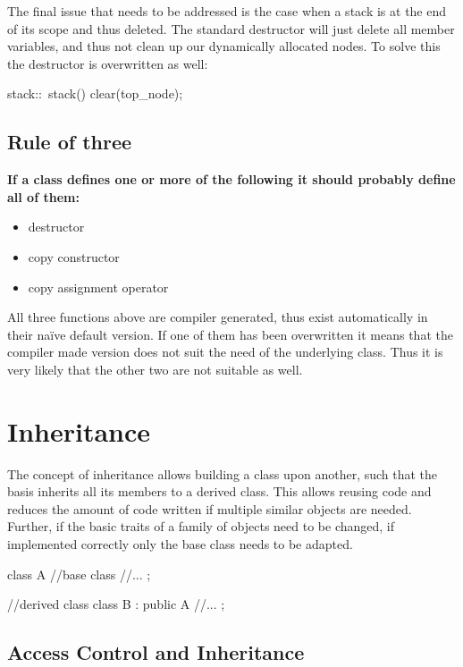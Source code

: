 \documentclass[10pt,a4paper]{scrartcl}
\begin{document}
\begin{multicols*}{2}
The final issue that needs to be addressed is the case when a stack is at the end of its scope and thus deleted. The standard destructor will just delete all member variables, and thus not clean up our dynamically allocated nodes. To solve this the destructor is overwritten as well:

\begin{TPCpp}
stack::~stack() {
	clear(top_node);
}
\end{TPCpp}

\subsection{Rule of three}
\label{sec:RuleOfThree}

\textbf{If a class defines one or more of the following it should probably define all of them:}

\begin{itemize}
\item destructor
\item copy constructor
\item copy assignment operator
\end{itemize}

All three functions above are compiler generated, thus exist automatically in their naïve default version. If one of them has been overwritten it means that the compiler made version does not suit the need of the underlying class. Thus it is very likely that the other two are not suitable as well.

\section{Inheritance}
\label{sec:Inheritance}

The concept of inheritance allows building a class upon another, such that the basis inherits all its members to a derived class. This allows reusing code and reduces the amount of code written if multiple similar objects are needed. Further, if the basic traits of a family of objects need to be changed, if implemented correctly only the base class needs to be adapted.

\begin{TPCpp}
class A{	//base class
	//... 
};

//derived class
class B : public A {
	//...
};
\end{TPCpp}

\subsection{Access Control and Inheritance}
\label{sec:AccessControlAndInheritance}


\end{multicols*}
\end{document}
